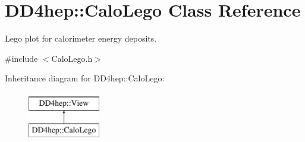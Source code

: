 \hypertarget{class_d_d4hep_1_1_calo_lego}{}\section{D\+D4hep\+:\+:Calo\+Lego Class Reference}
\label{class_d_d4hep_1_1_calo_lego}


Lego plot for calorimeter energy deposits.  




{\ttfamily \#include $<$Calo\+Lego.\+h$>$}

Inheritance diagram for D\+D4hep\+:\+:Calo\+Lego\+:\begin{figure}[H]
\begin{center}
\leavevmode
\includegraphics[height=2.000000cm]{class_d_d4hep_1_1_calo_lego}
\end{center}
\end{figure}
